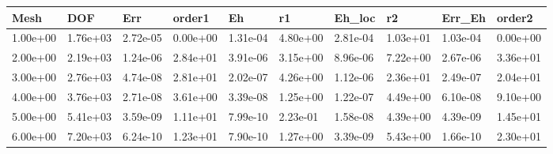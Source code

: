 \begin{tabular}{llllllllll}
Mesh & DOF & Err & order1 & Eh & r1 & Eh_loc & r2 & Err_Eh & order2 \\ 
\hline 
1.00e+00 & 1.76e+03 & 2.72e-05 & 0.00e+00 & 1.31e-04 & 4.80e+00 & 2.81e-04 & 1.03e+01 & 1.03e-04 & 0.00e+00 \\ 
2.00e+00 & 2.19e+03 & 1.24e-06 & 2.84e+01 & 3.91e-06 & 3.15e+00 & 8.96e-06 & 7.22e+00 & 2.67e-06 & 3.36e+01 \\ 
3.00e+00 & 2.76e+03 & 4.74e-08 & 2.81e+01 & 2.02e-07 & 4.26e+00 & 1.12e-06 & 2.36e+01 & 2.49e-07 & 2.04e+01 \\ 
4.00e+00 & 3.76e+03 & 2.71e-08 & 3.61e+00 & 3.39e-08 & 1.25e+00 & 1.22e-07 & 4.49e+00 & 6.10e-08 & 9.10e+00 \\ 
5.00e+00 & 5.41e+03 & 3.59e-09 & 1.11e+01 & 7.99e-10 & 2.23e-01 & 1.58e-08 & 4.39e+00 & 4.39e-09 & 1.45e+01 \\ 
6.00e+00 & 7.20e+03 & 6.24e-10 & 1.23e+01 & 7.90e-10 & 1.27e+00 & 3.39e-09 & 5.43e+00 & 1.66e-10 & 2.30e+01 \\ 
\hline 
\end{tabular}